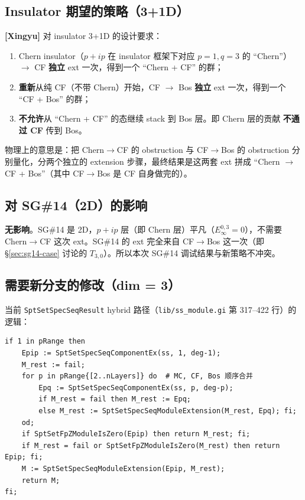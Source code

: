 \documentclass[a4paper,fontset=ubuntu,12pt]{ctexart}
\begin{document}
\subsection{Insulator 期望的策略（3+1D）}

\textbf{[Xingyu]} 对 insulator 3+1D 的设计要求：
\begin{enumerate}
\item Chern insulator（$p + ip$ 在 insulator 框架下对应 $p = 1, q = 3$ 的 ``Chern''）$\to$ CF \textbf{独立} ext 一次，得到一个 ``Chern + CF'' 的群；
\item \textbf{重新}从纯 CF（不带 Chern）开始，CF $\to$ Bos \textbf{独立} ext 一次，得到一个 ``CF + Bos'' 的群；
\item \textbf{不允许}从 ``Chern + CF'' 的态继续 stack 到 Bos 层。即 Chern 层的贡献 \textbf{不通过 CF} 传到 Bos。
\end{enumerate}

物理上的意思是：把 Chern$\to$CF 的 obstruction 与 CF$\to$Bos 的 obstruction 分别量化，分两个独立的 extension 步骤，最终结果是这两套 ext 拼成 ``Chern $\to$ CF + Bos''（其中 CF$\to$Bos 是 CF 自身做完的）。

\subsection{对 SG\#14（2D）的影响}

\textbf{无影响}。SG\#14 是 2D，$p + ip$ 层（即 Chern 层）平凡（$E_\infty^{0, 3} = 0$），不需要 Chern$\to$CF 这次 ext。SG\#14 的 ext 完全来自 CF$\to$Bos 这一次（即 \S\ref{sec:sg14-case} 讨论的 $T_{3, 0}$）。所以本次 SG\#14 调试结果与新策略不冲突。

\subsection{需要新分支的修改（dim = 3）}

当前 \texttt{SptSetSpecSeqResult} hybrid 路径（\texttt{lib/ss\_module.gi} 第 317--422 行）的逻辑：
\begin{lstlisting}
if 1 in pRange then
    Epip := SptSetSpecSeqComponentEx(ss, 1, deg-1);
    M_rest := fail;
    for p in pRange{[2..nLayers]} do  # MC, CF, Bos 顺序合并
        Epq := SptSetSpecSeqComponentEx(ss, p, deg-p);
        if M_rest = fail then M_rest := Epq;
        else M_rest := SptSetSpecSeqModuleExtension(M_rest, Epq); fi;
    od;
    if SptSetFpZModuleIsZero(Epip) then return M_rest; fi;
    if M_rest = fail or SptSetFpZModuleIsZero(M_rest) then return Epip; fi;
    M := SptSetSpecSeqModuleExtension(Epip, M_rest);
    return M;
fi;
\end{lstlisting}
\end{document}
